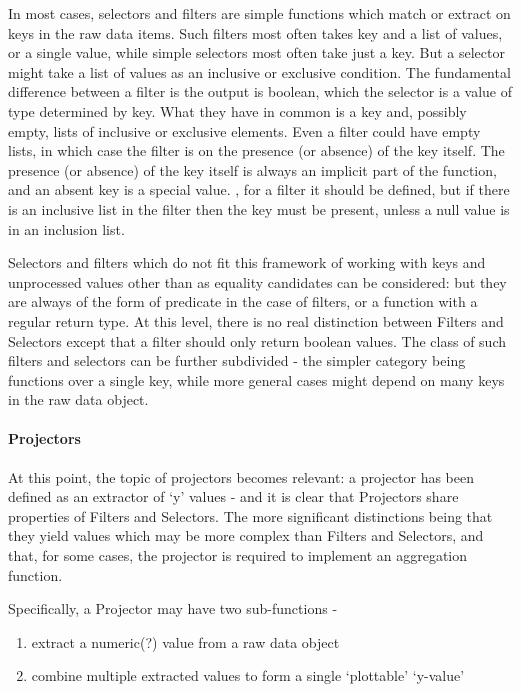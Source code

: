 In most cases, selectors and filters are simple functions which match or extract on keys in the raw data items.
Such filters most often takes key and a list of values, or a single value, while simple selectors most often take just a key.
But a selector might take a list of values as an inclusive or exclusive condition.
The fundamental difference between a filter is the output is boolean, which the selector is a value of type determined by key.
What they have in common is a key and, possibly empty, lists of inclusive or exclusive elements.
Even a filter could have empty lists, in which case the filter is on the presence (or absence) of the key itself.
The presence (or absence) of the key itself is always an implicit part of the function, and an absent key is a special value.
, for a filter it should be defined, but if there is an inclusive list in the filter then the key must be present, unless a null value is in an inclusion list.

Selectors and filters which do not fit this framework of working with keys and unprocessed values other than as equality candidates can be considered: but they are always of the form of predicate in the case of filters, or a function with a regular return type.  At this level, there is no real distinction between Filters and Selectors except that a filter should only return boolean values.  The class of such filters and selectors can be further subdivided - the simpler category being functions over a single key, while more general cases might depend on many keys in the raw data object.

\paragraph{Projectors}
At this point, the topic of projectors becomes relevant: a projector has been defined as an extractor of `y' values - and it is clear that Projectors share properties of Filters and Selectors.  The more significant distinctions being that they yield values which may be more complex than Filters and Selectors, and that, for some cases, the projector is required to implement an aggregation function.

Specifically, a Projector may have two sub-functions - 
\begin{enumerate}
    \item extract a numeric(?) value from a raw data object
    \item combine multiple extracted values to form a single `plottable' `y-value'
\end{enumerate}

